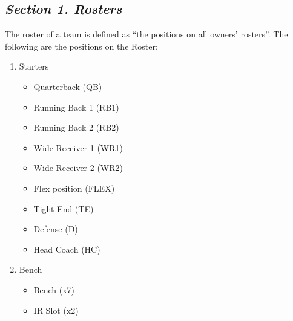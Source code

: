 \documentclass{article}
\begin{document}
    \subsection{\textit{Section 1. Rosters}}
    The roster of a team is defined as “the positions on all owners’ rosters”. The following are the positions on the Roster:
    \begin{enumerate}[label=\Alph*)]
        \item Starters
        \begin{itemize}
            \item Quarterback (QB)
            \item Running Back 1 (RB1)
            \item Running Back 2 (RB2)
            \item Wide Receiver 1 (WR1)
            \item Wide Receiver 2 (WR2)
            \item Flex position (FLEX)
            \item Tight End (TE)
            \item Defense (D)
            \item Head Coach (HC)
        \end{itemize}
        \item Bench
        \begin{itemize}
            \item Bench (x7)
            \item IR Slot (x2)
        \end{itemize}
    \end{enumerate}
\end{document}
